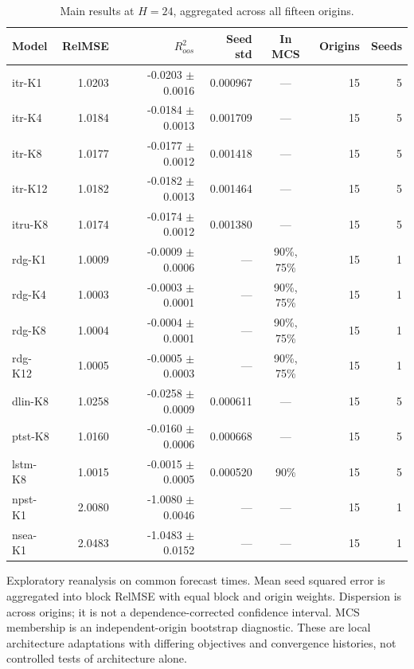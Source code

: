 \begin{table}[!t]
\centering
\caption{Main results at $H=24$, aggregated across all fifteen origins.}
\label{tab:main}
\begin{tabular}{lrrrcrr}
\toprule
Model & RelMSE & $R^2_{oos}$ & Seed std & In MCS & Origins & Seeds \\
\midrule
itr-K1 & 1.0203 & -0.0203 $\pm$ 0.0016 & 0.000967 & --- & 15 & 5 \\
itr-K4 & 1.0184 & -0.0184 $\pm$ 0.0013 & 0.001709 & --- & 15 & 5 \\
itr-K8 & 1.0177 & -0.0177 $\pm$ 0.0012 & 0.001418 & --- & 15 & 5 \\
itr-K12 & 1.0182 & -0.0182 $\pm$ 0.0013 & 0.001464 & --- & 15 & 5 \\
itru-K8 & 1.0174 & -0.0174 $\pm$ 0.0012 & 0.001380 & --- & 15 & 5 \\
rdg-K1 & 1.0009 & -0.0009 $\pm$ 0.0006 & --- & 90\%, 75\% & 15 & 1 \\
rdg-K4 & 1.0003 & -0.0003 $\pm$ 0.0001 & --- & 90\%, 75\% & 15 & 1 \\
rdg-K8 & 1.0004 & -0.0004 $\pm$ 0.0001 & --- & 90\%, 75\% & 15 & 1 \\
rdg-K12 & 1.0005 & -0.0005 $\pm$ 0.0003 & --- & 90\%, 75\% & 15 & 1 \\
dlin-K8 & 1.0258 & -0.0258 $\pm$ 0.0009 & 0.000611 & --- & 15 & 5 \\
ptst-K8 & 1.0160 & -0.0160 $\pm$ 0.0006 & 0.000668 & --- & 15 & 5 \\
lstm-K8 & 1.0015 & -0.0015 $\pm$ 0.0005 & 0.000520 & 90\% & 15 & 5 \\
npst-K1 & 2.0080 & -1.0080 $\pm$ 0.0046 & --- & --- & 15 & 1 \\
nsea-K1 & 2.0483 & -1.0483 $\pm$ 0.0152 & --- & --- & 15 & 1 \\
\bottomrule
\end{tabular}
\vspace{2pt}\par\footnotesize Exploratory reanalysis on common forecast times. Mean seed squared error is aggregated into block RelMSE with equal block and origin weights. Dispersion is across origins; it is not a dependence-corrected confidence interval. MCS membership is an independent-origin bootstrap diagnostic. These are local architecture adaptations with differing objectives and convergence histories, not controlled tests of architecture alone.
\end{table}
